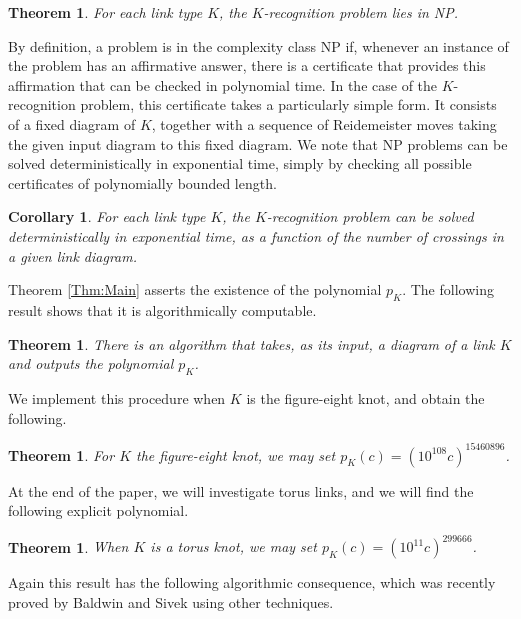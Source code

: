 \documentclass[oneside]{amsart}
\numberwithin{equation}{section}
\theoremstyle{plain}
\newtheorem{theorem}[equation]{Theorem}
\newtheorem{corollary}[equation]{Corollary}
\theoremstyle{definition}
\begin{document}
\begin{theorem}
\label{Thm:LinkDetectionNP}
For each link type $K$, the $K$-recognition problem lies in NP.
\end{theorem}

By definition, a problem is in the complexity class NP if, whenever an instance of the problem
has an affirmative answer, there is a certificate that provides this affirmation that can be
checked in polynomial time. In the case of the $K$-recognition problem, this certificate
takes a particularly simple form. It consists of a fixed diagram of $K$, together with a
sequence of Reidemeister moves taking the given input diagram to this fixed diagram.
We note that NP problems can be solved deterministically in exponential time, simply by checking
all possible certificates of polynomially bounded length. 

\begin{corollary}
\label{Cor:LinkDetectionExp}
For each link type $K$, the $K$-recognition problem can be solved deterministically in
exponential time, as a function of the number of crossings in a given link diagram.
\end{corollary}

Theorem \ref{Thm:Main} asserts the existence of the polynomial $p_K$. The following result
shows that it is algorithmically computable.

\begin{theorem}
\label{Thm:PolynomialComputable}
There is an algorithm that takes, as its input, a diagram of a link $K$ and outputs the polynomial $p_K$.
\end{theorem}

We implement this procedure when $K$ is the figure-eight knot, and obtain the following.

\begin{theorem}
\label{Thm:FigEight}
For $K$ the figure-eight knot, we may set $p_K(c) = (10^{108} c)^{15460896}$.
\end{theorem}

At the end of the paper, we will investigate torus links, and we will find the following explicit polynomial.

\begin{theorem}
\label{Thm:TorusKnotPoly}
When $K$ is a torus knot, we may set $p_K(c) = (10^{11}c)^{299666}$.
\end{theorem}

Again this result has the following algorithmic consequence, which was recently proved by Baldwin and Sivek \cite{BaldwinSivek} using other techniques. 
\end{document}

